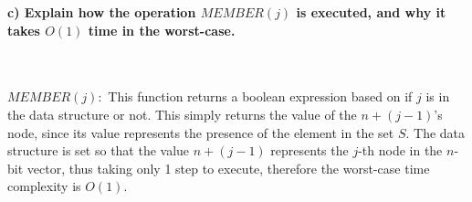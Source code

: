 \documentclass[20pt]{article}
\begin{document}
\noindent
\textbf{c) Explain how the operation $MEMBER(j)$ is executed, and why it takes $O(1)$ time in the worst-case.}

\noindent
\begin{text}
    \\\\
    $MEMBER(j):$ This function returns a boolean expression based on if $j$ is in the data structure or not. This simply returns the value of the $n + (j - 1)$'s node, since its value represents the presence of the element in the set $S$. The data structure is set so that the value $n + (j - 1)$ represents the $j$-th node in the $n$-bit vector, thus taking only 1 step to execute, therefore the worst-case time complexity is $O(1)$.
\end{text}
\end{document}
